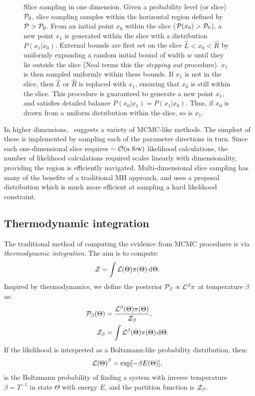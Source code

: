 \begin{figure}[tp]
  \caption{Slice sampling in one dimension. 
    Given a probability level (or slice) $\mathcal{P}_0$, slice sampling samples within the horizontal region defined by $\mathcal{P}>\mathcal{P}_0$. 
    From an initial point $x_0$ within the slice ($\mathcal{P}(x_0)>\mathcal{P}_0$), a new point $x_1$ is generated within the slice with a distribution $P(x_1|x_0)$.
    External bounds are first set on the slice $\hat{L}<x_0<\hat{R}$ by uniformly expanding a random initial bound of width $w$ until they lie outside the slice (Neal terms this the {\em stepping out\/} procedure). 
    $x_1$ is then sampled uniformly within these bounds.  
    If $x_1$ is not in the slice, then $\hat{L}$ or $\hat{R}$ is replaced with $x_1$, ensuring that $x_0$ is still within the slice.
    This procedure is guaranteed to generate a new point $x_1$, and satisfies detailed balance $P(x_0|x_1) = P(x_1|x_0)$. Thus, if $x_0$ is drawn from a uniform distribution within the slice, so is $x_1$.\label{fig:bay:1d_slice}
  }
\end{figure}



In higher dimensions,~\cite{NealSlice} suggests a variety of MCMC-like methods. The simplest of these is implemented by sampling each of the parameter directions in turn. Since each one-dimensional slice requires ${\sim\mathcal{O}{\left(\text{a few}\right)}}$ likelihood calculations, the number of likelihood calculations required scales linearly with dimensionality, providing the region is efficiently navigated. Multi-dimensional slice sampling has many of the benefits of a traditional MH approach, and uses a proposal distribution which is much more efficient at sampling a hard likelihood constraint.

\subsection{Thermodynamic integration}
The traditional method of computing the evidence from MCMC procedures is via {\em thermodynamic integration}.
The aim is to compute:
\begin{equation}
  \mathcal{Z} = \int \mathcal{L}(\Theta) \pi(\Theta) \operatorname{d}^{}\!{\Theta}.
\end{equation}
Inspired by thermodynamics, we define the posterior $\mathcal{P}_\beta \propto \mathcal{L}^\beta\pi$ at temperature $\beta$ as:
\begin{align}
  \mathcal{P}_\beta(\Theta) &= \frac{\mathcal{L}^{\beta}(\Theta) \pi(\Theta)}{\mathcal{Z}_\beta}, 
  \label{eqn:bay:posteriorb}
  \\
  \mathcal{Z}_\beta &= \int\mathcal{L}^{\beta}(\Theta) \pi(\Theta) \operatorname{d}^{}\!{\Theta}.
  \label{eqn:bay:evb}
\end{align}
If the likelihood is interpreted as a Boltzmann-like probability distribution, then:
\begin{equation}
{\mathcal{L}(\Theta)}^\beta = \exp[-\beta E(\Theta)],
\end{equation}
is the Boltzmann probability of finding a system with inverse temperature $\beta = T^{-1}$ in state $\Theta$ with energy $E$, and the partition function is $\mathcal{Z}_\beta$.

